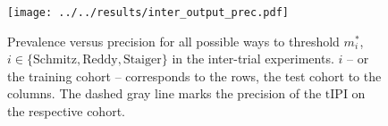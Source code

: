 \begin{figure}
    \centering
    \texttt{[image: ../../results/inter\_output\_prec.pdf]}
    \caption{Prevalence versus precision for all possible ways to threshold $m^*_i$, $i \in 
        \{ \text{Schmitz}, \text{Reddy}, \text{Staiger} \}$ in the inter-trial experiments. $i$ -- or the 
        training cohort -- corresponds to the rows, the test cohort to the columns. The dashed gray 
        line marks the precision of the $\text{tIPI}$ on the respective cohort.}
    \label{fig:inter-output-prec}
\end{figure}